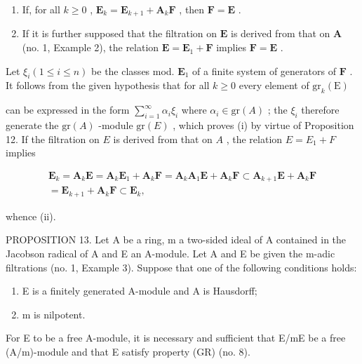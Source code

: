 \begin{enumerate}
\def\labelenumi{(\roman{enumi})}
\item
  If, for all \(k \geqslant 0\) , \(\mathbf{E}_k = \mathbf{E}_{k+1} + \mathbf{A}_k\mathbf{F}\) , then \(\mathbf{F} = \mathbf{E}\) .
\item
  If it is further supposed that the filtration on \(\mathbf{E}\) is derived from that on \(\mathbf{A}\) (no. 1, Example 2), the relation \(\mathbf{E} = \mathbf{E}_1 + \mathbf{F}\) implies \(\mathbf{F} = \mathbf{E}\) .
\end{enumerate}

Let \(\xi_{i}(1\leqslant i\leqslant n)\) be the classes mod. \(\mathbf{E}_1\) of a finite system of generators of \(\mathbf{F}\) . It follows from the given hypothesis that for all \(k\geqslant 0\) every element of \(\mathrm{gr}_k(\mathrm{E})\)

can be expressed in the form \(\sum_{i=1}^{\infty} \alpha_i \xi_i\) where \(\alpha_i \in \mathrm{gr}(A)\) ; the \(\xi_i\) therefore generate the \(\mathrm{gr}(A)\) -module \(\mathrm{gr}(E)\) , which proves (i) by virtue of Proposition 12. If the filtration on \(E\) is derived from that on \(A\) , the relation \(E = E_1 + F\) implies

\[
\begin{array}{r} \mathbf {E} _ {k} = \mathbf {A} _ {k} \mathbf {E} = \mathbf {A} _ {k} \mathbf {E} _ {1} + \mathbf {A} _ {k} \mathbf {F} = \mathbf {A} _ {k} \mathbf {A} _ {1} \mathbf {E} + \mathbf {A} _ {k} \mathbf {F} \subset \mathbf {A} _ {k + 1} \mathbf {E} + \mathbf {A} _ {k} \mathbf {F} \\ = \mathbf {E} _ {k + 1} + \mathbf {A} _ {k} \mathbf {F} \subset \mathbf {E} _ {k}, \end{array}
\]

whence (ii).

PROPOSITION 13. Let A be a ring, m a two-sided ideal of A contained in the Jacobson radical of A and E an A-module. Let A and E be given the m-adic filtrations (no. 1, Example 3). Suppose that one of the following conditions holds:

\begin{enumerate}
\def\labelenumi{(\alph{enumi})}
\item
  E is a finitely generated A-module and A is Hausdorff;
\item
  m is nilpotent.
\end{enumerate}

For E to be a free A-module, it is necessary and sufficient that E/mE be a free (A/m)-module and that E satisfy property (GR) (no. 8).

